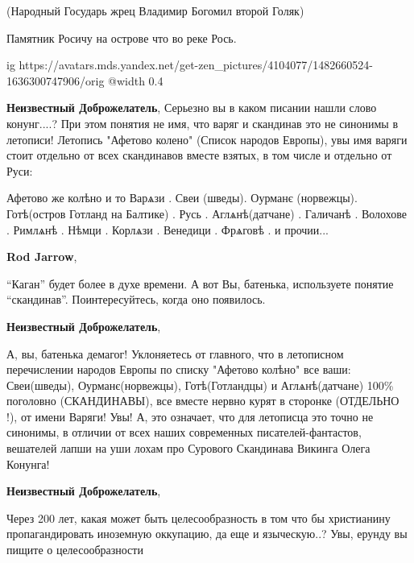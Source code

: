\begin{itemize}
(Народный Государь жрец Владимир Богомил второй Голяк)

Памятник Росичу на острове что во реке Рось.

\ifcmt
  ig https://avatars.mds.yandex.net/get-zen_pictures/4104077/1482660524-1636300747906/orig
  @width 0.4
\fi


\textbf{Неизвестный Доброжелатель}, Серьезно вы в каком писании нашли слово конунг....?
При этом понятия не имя, что варяг и скандинав это не синонимы в летописи!
Летопись "Афетово колено" (Список народов Европы), увы имя варяги стоит
отдельно от всех скандинавов вместе взятых, в том числе и отдельно от Руси:

Афетово же колѣно и то Варѧзи . Свеи (шведы). Оурманє (норвежцы). Готѣ(остров
Готланд на Балтике) . Русь . Аглѧнѣ(датчане) . Галичанѣ . Волохове . Римлѧнѣ .
Нѣмци . Корлѧзи . Венедици . Фрѧговѣ . и прочии...

\textbf{Rod Jarrow},

\enquote{Каган} будет более в духе времени. А вот Вы, батенька, используете
понятие \enquote{скандинав}. Поинтересуйтесь, когда оно появилось.

\textbf{Неизвестный Доброжелатель}, 

А, вы, батенька демагог! Уклоняетесь от главного, что в летописном перечислении
народов Европы по списку "Афетово колѣно" все ваши: Свеи(шведы),
Оурманє(норвежцы), Готѣ(Готландцы) и Аглѧнѣ(датчане) 100\% поголовно
(СКАНДИНАВЫ), все вместе нервно курят в сторонке (ОТДЕЛЬНО !), от имени Варяги!
Увы! А, это означает, что для летописца это точно не синонимы, в отличии от
всех наших современных писателей-фантастов, вешателей лапши на уши лохам про
Сурового Скандинава Викинга Олега Конунга!

\textbf{Неизвестный Доброжелатель}, 

Через 200 лет, какая может быть целесообразность в том что бы христианину
пропагандировать иноземную оккупацию, да еще и языческую..? Увы, ерунду вы
пищите о целесообразности

\end{itemize} %
